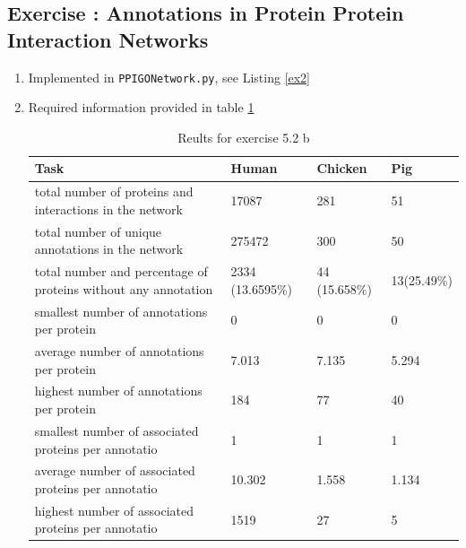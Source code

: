 \documentclass[10pt,a4paper]{article}
\newcommand{\exercise}[1]
{
  \stepcounter{subsection}
  \subsection*{Exercise \thesubsection: #1}

}
\begin{document}
\exercise{Annotations in Protein Protein Interaction Networks}
\begin{enumerate}
\item Implemented in \texttt{PPIGONetwork.py}, see Listing \ref{ex2}

\item Required information provided in table \ref{table:ex2a}
\begin{table}[!h]
\caption{Reults for exercise 5.2 b}
\label{table:ex2a}
\begin{tabular}{p{8cm} l l l}
Task & Human & Chicken & Pig\\
\hline
total number of proteins and interactions in the network & 17087 & 281 & 51\\
total number of unique annotations in the network & 275472 & 300 & 50\\
total number and percentage of proteins without any annotation & 2334 (13.6595\%) & 44 (15.658\%) & 13(25.49\%)\\
smallest number of annotations per protein & 0 & 0 & 0\\
average number of annotations per protein & 7.013 & 7.135 & 5.294\\
highest number of annotations per protein & 184 & 77 & 40\\
smallest number of associated proteins per annotatio & 1 & 1 & 1\\
average number of associated proteins per annotatio & 10.302 & 1.558 & 1.134\\
highest number of associated proteins per annotatio & 1519 & 27 & 5\\
\end{tabular}
\end{table}


\end{enumerate}
\end{document}
